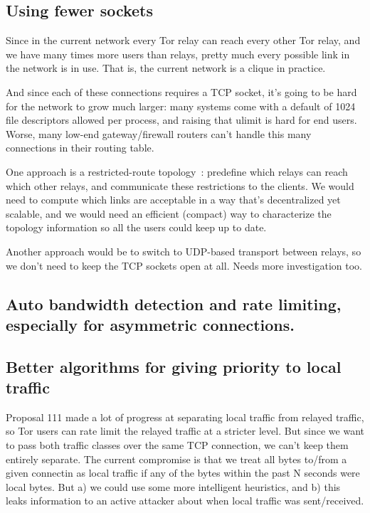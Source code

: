 \documentclass{article}
\begin{document}
\subsection{Using fewer sockets}

Since in the current network every Tor relay can reach every other Tor
relay, and we have many times more users than relays, pretty much every
possible link in the network is in use. That is, the current network
is a clique in practice.

And since each of these connections requires a TCP socket, it's going
to be hard for the network to grow much larger: many systems come with
a default of 1024 file descriptors allowed per process, and raising
that ulimit is hard for end users. Worse, many low-end gateway/firewall
routers can't handle this many connections in their routing table.

One approach is a restricted-route topology~\cite{danezis:pet2003}:
predefine which relays can reach which other relays, and communicate
these restrictions to the clients. We would need to compute which links
are acceptable in a way that's decentralized yet scalable, and we would
need an efficient (compact) way to characterize the topology information
so all the users could keep up to date.

Another approach would be to switch to UDP-based transport between
relays, so we don't need to keep the TCP sockets open at all. Needs more
investigation too.

\subsection{Auto bandwidth detection and rate limiting, especially for
      asymmetric connections.}


\subsection{Better algorithms for giving priority to local traffic}

Proposal 111 made a lot of progress at separating local traffic from
relayed traffic, so Tor users can rate limit the relayed traffic at a
stricter level. But since we want to pass both traffic classes over the
same TCP connection, we can't keep them entirely separate. The current
compromise is that we treat all bytes to/from a given connectin as
local traffic if any of the bytes within the past N seconds were local
bytes.  But a) we could use some more intelligent heuristics, and b)
this leaks information to an active attacker about when local traffic
was sent/received.
\end{document}
